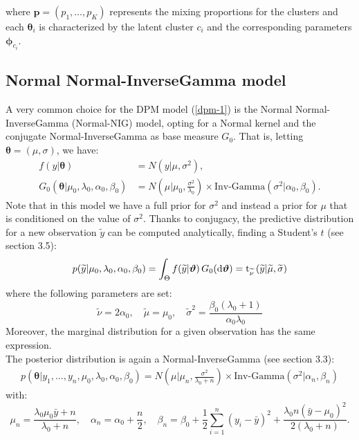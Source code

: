 where $\mathbf{p}=(p_1,\dots,p_K)$ represents the mixing proportions for the clusters and each $\boldsymbol\theta_i$ is characterized by the latent cluster $c_i$ and the corresponding parameters $\boldsymbol\phi_{c_i}$.

\subsection{Normal Normal-InverseGamma model} \label{nnig}
A very common choice for the DPM model (\ref{dpm-1}) is the Normal Normal-InverseGamma (Normal-NIG) model, opting for a Normal kernel and the conjugate Normal-InverseGamma as base measure $G_0$. That is, letting $\boldsymbol\theta=(\mu,\sigma)$, we have:
\begin{equation}
	\begin{aligned}
		f(y|\boldsymbol\theta)&=N(y| \mu ,\sigma^2),  \\
		G_0(\boldsymbol\theta|\mu_0,\lambda_0, \alpha_0, 	\beta_0)
		&=N\left(\mu | \mu_0 ,\frac{\sigma^2} {\lambda_0}\right) \times \text{Inv-Gamma}(\sigma^2|\alpha_0, \beta_0 ).
	\end{aligned}
\end{equation}
Note that in this model we have a full prior for $\sigma^2$ and instead a prior for $\mu$ that is conditioned on the value of $\sigma^2$.
Thanks to conjugacy, the predictive distribution for a new observation $\widetilde{y}$ can be computed analytically, finding a Student's $t$ (see \cite{integral} section 3.5):
\begin{align*}
	p(\widetilde{y}|\mu_0,\lambda_0, \alpha_0, \beta_0) =
	\int_\Theta f(\widetilde{y}|\boldsymbol{\vartheta}) \, G_0(\mathrm d\boldsymbol{\vartheta}) =
	\text{t}_{\widetilde \nu}\left(\widetilde{y}|\widetilde{\mu},\widetilde{\sigma}\right)
\end{align*}
where the following parameters are set:
$$
	\widetilde{\nu}=2 \alpha_0, \quad
	\widetilde{\mu}=\mu_0, \quad
	\widetilde{\sigma}^2= \frac{\beta_0(\lambda_0+1)}{\alpha_0 \lambda_0}
$$
Moreover, the marginal distribution for a given observation has the same expression. \\
The posterior distribution is again a Normal-InverseGamma (see \cite{integral} section 3.3):
\begin{align*}
	p(\boldsymbol\theta|y_1,\dots,y_n,\mu_0,\lambda_0, \alpha_0, \beta_0)=N\left(\mu | \mu_n ,\frac{\sigma^2} {\lambda_0 + n}\right) \times \text{Inv-Gamma}(\sigma^2|\alpha_n, \beta_n )
\end{align*}
with:
$$
\mu_n=\frac{\lambda_0 \mu_0 \bar{y} + n}{\lambda_0 + n}, \quad \alpha_n= \alpha_0 + \frac{n}{2}, \quad \beta_n= \beta_0 + \frac{1}{2}\sum_{i=1}^{n} (y_i-\bar{y})^2 + \frac{\lambda_0 n(\bar{y}-\mu_0)^2}{2(\lambda_0 + n)}.
$$
